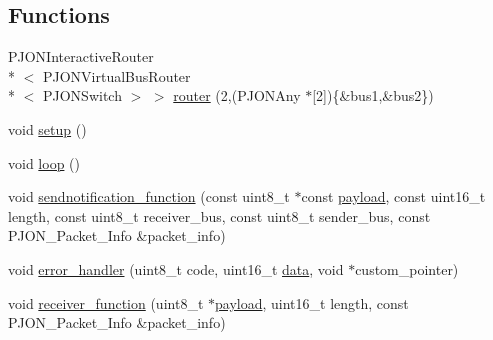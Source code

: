 \subsection*{Functions}
\begin{DoxyCompactItemize}
\item 
P\-J\-O\-N\-Interactive\-Router\\*
$<$ P\-J\-O\-N\-Virtual\-Bus\-Router\\*
$<$ P\-J\-O\-N\-Switch $>$ $>$ \hyperlink{BlinkingSwitch__SWBB-TL__semitransparent_8ino_a8c8a35b003b9467f7f3b1a828c90a5b5}{router} (2,(P\-J\-O\-N\-Any $\ast$\mbox{[}2\mbox{]})\{\&bus1,\&bus2\})
\item 
void \hyperlink{BlinkingSwitch__SWBB-TL__semitransparent_8ino_a4fc01d736fe50cf5b977f755b675f11d}{setup} ()
\item 
void \hyperlink{BlinkingSwitch__SWBB-TL__semitransparent_8ino_afe461d27b9c48d5921c00d521181f12f}{loop} ()
\item 
void \hyperlink{BlinkingSwitch__SWBB-TL__semitransparent_8ino_af488e931618139cd40b126dabfe9b6bb}{sendnotification\-\_\-function} (const uint8\-\_\-t $\ast$const \hyperlink{Uno__Dragino__LoRa__GPS__Shield__TTN_8ino_a78a402d1762842473567de90b11ed256}{payload}, const uint16\-\_\-t length, const uint8\-\_\-t receiver\-\_\-bus, const uint8\-\_\-t sender\-\_\-bus, const P\-J\-O\-N\-\_\-\-Packet\-\_\-\-Info \&packet\-\_\-info)
\item 
void \hyperlink{BlinkingSwitch__SWBB-TL__semitransparent_8ino_acbeb8ee6ee1960e6bba5ab9bcf75db6b}{error\-\_\-handler} (uint8\-\_\-t code, uint16\-\_\-t \hyperlink{blink6drcs_8c_abe49a82806b5db2e012bc33839af03e6}{data}, void $\ast$custom\-\_\-pointer)
\item 
void \hyperlink{BlinkingSwitch__SWBB-TL__semitransparent_8ino_a76fc5e73c141f748dcc1809fdcfa1714}{receiver\-\_\-function} (uint8\-\_\-t $\ast$\hyperlink{Uno__Dragino__LoRa__GPS__Shield__TTN_8ino_a78a402d1762842473567de90b11ed256}{payload}, uint16\-\_\-t length, const P\-J\-O\-N\-\_\-\-Packet\-\_\-\-Info \&packet\-\_\-info)
\end{DoxyCompactItemize}
